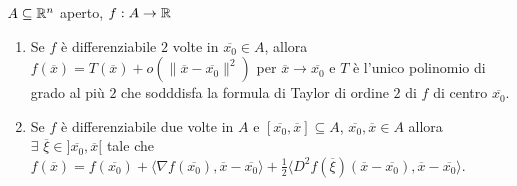\begin{theorem}
	
	\label{th: pag 377}
	$A \subseteq \mathbb{R}^n$ aperto, $f: A \rightarrow \mathbb{R}$
	\begin{enumerate}
		\item Se $f$ è differenziabile $2$ volte in $\overline{x_0} \in A$, allora $f(\overline{x})=T(\overline{x})+o(\|\overline{x}-\overline{x_0}\|^2)$ per $\overline{x}\rightarrow \overline{x_0}$ e $T$ è l'unico polinomio di grado al più $2$ che sodddisfa  la formula di Taylor di ordine $2$ di $f$ di centro $\overline{x_0}$.
		\item Se $f$ è differenziabile due volte in $A$ e $[\overline{x_0},\overline{x}]\subseteq A$, $\overline{x_0},\overline{x}\in A$ allora $ \exists\,\, \overline{\xi}\in ]\overline{x_0},\overline{x}[$ tale che $f(\overline{x})=f(\overline{x_0})+\langle \nabla f(\overline{x_0}),\overline{x} -\overline{x_0}\rangle +\frac{1}{2}\langle D^2 f(\overline{\xi})(\overline{x}-\overline{x_0}),\overline{x}-\overline{x_0} \rangle$.
	\end{enumerate} 
\end{theorem}


